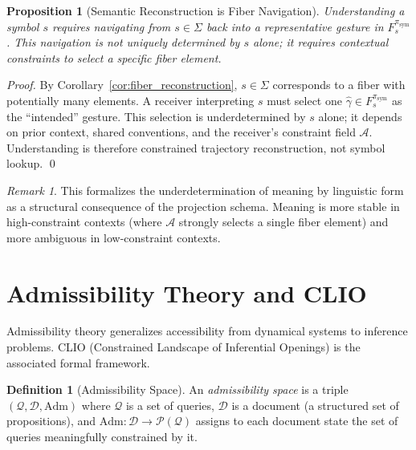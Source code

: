 \documentclass[12pt, a4paper, twoside]{article}
\theoremstyle{plain}
\newtheorem{proposition}[theorem]{Proposition}
\theoremstyle{definition}
\newtheorem{definition}[theorem]{Definition}
\theoremstyle{remark}
\newtheorem{remark}[theorem]{Remark}
\newcommand{\Acc}{\mathcal{A}}
\newcommand{\Adm}{\mathrm{Adm}}
\newcommand{\Proj}{\pi}
\newcommand{\Fibover}[2]{F^{#1}_{#2}}
\begin{document}
\begin{proposition}[Semantic Reconstruction is Fiber Navigation]
\label{prop:semantic_reconstruction}
Understanding a symbol $s$ requires navigating from $s \in \Sigma$ back into a
representative gesture in $\Fibover{\Proj_{\mathrm{sym}}}{s}$. This navigation
is not uniquely determined by $s$ alone; it requires contextual constraints to
select a specific fiber element.
\end{proposition}

\begin{proof}
By Corollary~\ref{cor:fiber_reconstruction}, $s \in \Sigma$ corresponds to a
fiber with potentially many elements. A receiver interpreting $s$ must select
one $\hat{\gamma} \in \Fibover{\Proj_{\mathrm{sym}}}{s}$ as the ``intended''
gesture. This selection is underdetermined by $s$ alone; it depends on prior
context, shared conventions, and the receiver's constraint field $\Acc$.
Understanding is therefore constrained trajectory reconstruction, not
symbol lookup.
\qed
\end{proof}

\begin{remark}
This formalizes the underdetermination of meaning by linguistic form as a
structural consequence of the projection schema. Meaning is more stable in
high-constraint contexts (where $\Acc$ strongly selects a single fiber element)
and more ambiguous in low-constraint contexts.
\end{remark}

\section{Admissibility Theory and CLIO}
\label{sec:admissibility}

Admissibility theory generalizes accessibility from dynamical systems to
inference problems. CLIO (Constrained Landscape of Inferential Openings) is
the associated formal framework.

\begin{definition}[Admissibility Space]
An \emph{admissibility space} is a triple $(\mathcal{Q}, \mathcal{D}, \Adm)$
where $\mathcal{Q}$ is a set of queries, $\mathcal{D}$ is a document (a
structured set of propositions), and
$\Adm: \mathcal{D} \to \mathcal{P}(\mathcal{Q})$
assigns to each document state the set of queries meaningfully constrained
by it.
\end{definition}
\end{document}
